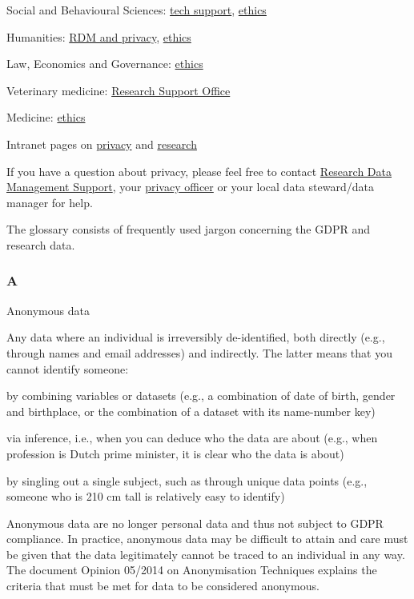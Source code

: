 \documentclass[
]{book}
\begin{document}
Social and Behavioural Sciences: \href{https://techsupport.fss.uu.nl/}{tech support},
\href{https://ferb.sites.uu.nl/}{ethics}

Humanities: \href{https://cdh.uu.nl/research/data-management-privacy/}{RDM and privacy},
\href{https://fetc-gw.wp.hum.uu.nl/}{ethics}

Law, Economics and Governance: \href{https://intranet.uu.nl/en/knowledgebase/facultys-ethical-review-committee}{ethics}

Veterinary medicine: \href{https://www.uu.nl/en/node/589/onderzoeksbureauresearch-support-office}{Research Support Office}

Medicine: \href{https://www.metc-utrecht.nl/en/}{ethics}

Intranet pages on \href{https://intranet.uu.nl/en/knowledge-base/privacy-at-uu}{privacy} and
\href{https://intranet.uu.nl/en/knowledgebase/research}{research}

If you have a question about privacy, please feel free to contact
\href{https://www.uu.nl/en/research/research-data-management/contact-us}{Research Data Management Support},
your \href{https://intranet.uu.nl/en/knowledgebase/privacyofficers}{privacy officer}
or your local data steward/data manager for help.

The glossary consists of frequently used jargon concerning the GDPR and research data.

\hypertarget{a}{%
\subsubsection{A}\label{a}}

Anonymous data

Any data where an individual is irreversibly de-identified, both directly (e.g., through names and email addresses) and indirectly. The latter means that you cannot identify someone:

by combining variables or datasets (e.g., a combination of date of birth, gender and birthplace, or the combination of a dataset with its name-number key)

via inference, i.e., when you can deduce who the data are about (e.g., when profession is Dutch prime minister, it is clear who the data is about)

by singling out a single subject, such as through unique data points (e.g., someone who is 210 cm tall is relatively easy to identify)

Anonymous data are no longer personal data and thus not subject to GDPR compliance. In practice, anonymous data may be difficult
to attain and care must be given that the data legitimately cannot be traced to an individual in any way. The document
Opinion 05/2014 on Anonymisation Techniques
explains the criteria that must be met for data to be considered anonymous.
\end{document}
